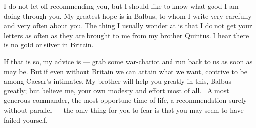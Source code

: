

 I do not let off recommending you, but I should like to know what good I am doing through you. My greatest hope is in Balbus, to whom I write very carefully and very often about you. The thing I usually wonder at is that I do not get your letters as often as they are brought to me from my brother Quintus. I hear there is no gold or silver in Britain.

 If that is so, my advice is — grab some war-chariot and run back to us as soon as may be. But if even without Britain we can attain what we want, contrive to be among Caesar's intimates. My brother will help you greatly in this, Balbus greatly; but believe me, your own modesty and effort most of all. \dag\ A most generous commander, the most opportune time of life, a recommendation surely without parallel — the only thing for you to fear is that you may seem to have failed yourself.
